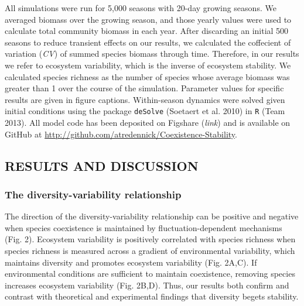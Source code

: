 \documentclass[12pt,]{article}
\begin{document}
All simulations were run for 5,000 seasons with 20-day growing seasons.
We averaged biomass over the growing season, and those yearly values
were used to calculate total community biomass in each year. After
discarding an initial 500 seasons to reduce transient effects on our
results, we calculated the coffecient of variation (\emph{CV}) of summed
species biomass through time. Therefore, in our results we refer to
ecosystem variability, which is the inverse of ecosystem stability. We
calculated species richness as the number of species whose average
biomass was greater than 1 over the course of the simulation. Parameter
values for specific results are given in figure captions. Within-season
dynamics were solved given initial conditions using the package
\texttt{deSolve} (Soetaert et al. 2010) in \texttt{R} (Team 2013). All
model code has been deposited on Figshare (\emph{link}) and is available
on GitHub at \url{http://github.com/atredennick/Coexistence-Stability}.

\subsection{RESULTS AND DISCUSSION}\label{results-and-discussion}

\subsubsection{The diversity-variability
relationship}\label{the-diversity-variability-relationship}

The direction of the diversity-variability relationship can be positive
and negative when species coexistence is maintained by
fluctuation-dependent mechanisms (Fig. 2). Ecosystem variability is
positively correlated with species richness when species richness is
measured across a gradient of environmental variability, which maintains
diversity and promotes ecosystem variability (Fig. 2A,C). If
environmental conditions are sufficient to maintain coexistence,
removing species increases ecosystem variability (Fig. 2B,D). Thus, our
results both confirm and contrast with theoretical and experimental
findings that diversity begets stability.
\end{document}
